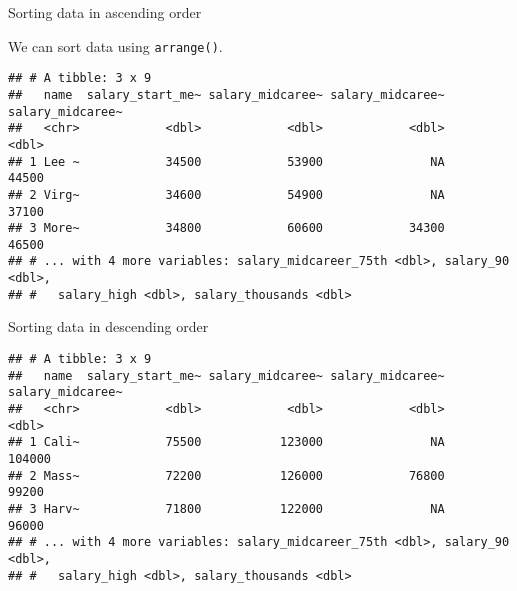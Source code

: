 \documentclass[ignorenonframetext,]{beamer}
\newenvironment{Shaded}{\begin{snugshade}}{\end{snugshade}}
\newcommand{\KeywordTok}[1]{\textcolor[rgb]{0.13,0.29,0.53}{\textbf{#1}}}
\newcommand{\DecValTok}[1]{\textcolor[rgb]{0.00,0.00,0.81}{#1}}
\newcommand{\StringTok}[1]{\textcolor[rgb]{0.31,0.60,0.02}{#1}}
\newcommand{\CommentTok}[1]{\textcolor[rgb]{0.56,0.35,0.01}{\textit{#1}}}
\newcommand{\OperatorTok}[1]{\textcolor[rgb]{0.81,0.36,0.00}{\textbf{#1}}}
\newcommand{\NormalTok}[1]{#1}
\begin{document}
\begin{frame}[fragile]{Sorting data in ascending order}

We can sort data using \texttt{arrange()}.

\begin{Shaded}
\end{Shaded}

\begin{verbatim}
## # A tibble: 3 x 9
##   name  salary_start_me~ salary_midcaree~ salary_midcaree~ salary_midcaree~
##   <chr>            <dbl>            <dbl>            <dbl>            <dbl>
## 1 Lee ~            34500            53900               NA            44500
## 2 Virg~            34600            54900               NA            37100
## 3 More~            34800            60600            34300            46500
## # ... with 4 more variables: salary_midcareer_75th <dbl>, salary_90 <dbl>,
## #   salary_high <dbl>, salary_thousands <dbl>
\end{verbatim}

\end{frame}

\begin{frame}[fragile]{Sorting data in descending order}

\begin{Shaded}
\end{Shaded}

\begin{verbatim}
## # A tibble: 3 x 9
##   name  salary_start_me~ salary_midcaree~ salary_midcaree~ salary_midcaree~
##   <chr>            <dbl>            <dbl>            <dbl>            <dbl>
## 1 Cali~            75500           123000               NA           104000
## 2 Mass~            72200           126000            76800            99200
## 3 Harv~            71800           122000               NA            96000
## # ... with 4 more variables: salary_midcareer_75th <dbl>, salary_90 <dbl>,
## #   salary_high <dbl>, salary_thousands <dbl>
\end{verbatim}

\end{frame}
\end{document}
